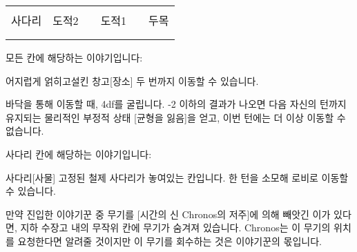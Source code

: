 \documentclass{report}
\begin{document}
	\begin{tabular}{|p{2cm}|p{2cm}|p{2cm}|p{2cm}|p{2cm}|p{2cm}|}
		\hline
		&     &  &     &  &    \\ \hline
		&     &  &     &  &    \\ \hline
		사다리 & 도적2 &  & 도적1 &  & 두목 \\ \hline
		&     &  &     &  &    \\ \hline
		&     &  &     &  &    \\ \hline
	\end{tabular}
	
	모든 칸에 해당하는 이야기입니다:
	\begin{story}{어지럽게 얽히고설킨 창고}{[장소]}
		두 번까지 이동할 수 있습니다.
		
		바닥을 통해 이동할 때, 4df를 굴립니다. -2 이하의 결과가 나오면 다음 자신의 턴까지 유지되는 물리적인 부정적 상태 [균형을 잃음]을 얻고, 이번 턴에는 더 이상 이동할 수 없습니다.
	\end{story}
	
	\bigskip
	
	사다리 칸에 해당하는 이야기입니다:
	\begin{story}{사다리}{[사물]}
		고정된 철제 사다리가 놓여있는 칸입니다. 한 턴을 소모해 로비로 이동할 수 있습니다.
	\end{story}
	
	만약 진입한 이야기꾼 중 무기를 [시간의 신 Chronos의 저주]에 의해 빼앗긴 이가 있다면, 지하 수장고 내의 무작위 칸에 무기가 숨겨져 있습니다. Chronos는 이 무기의 위치를 요청한다면 알려줄 것이지만 이 무기를 회수하는 것은 이야기꾼의 몫입니다.
\end{document}
